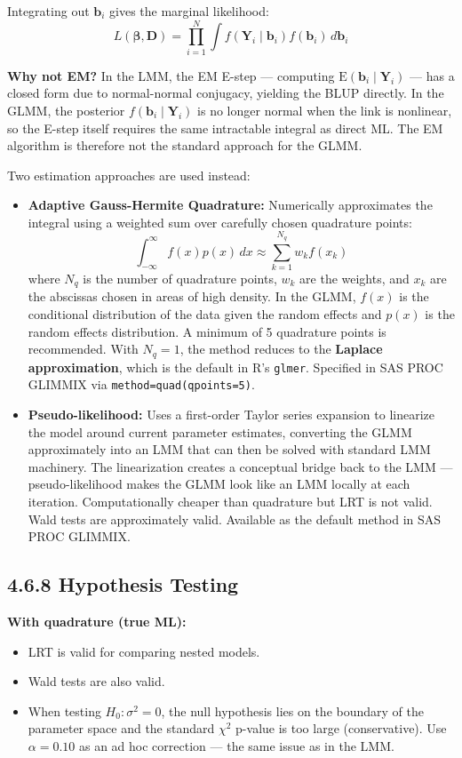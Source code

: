\documentclass[11pt]{article}
\newcommand{\bY}{\mathbf{Y}}
\newcommand{\bbeta}{\boldsymbol{\beta}}
\newcommand{\E}{\mathrm{E}}
\begin{document}
Integrating out $\mathbf{b}_i$ gives the marginal likelihood:
$$L(\bbeta, \mathbf{D}) = \prod_{i=1}^N \int f(\bY_i \mid \mathbf{b}_i) f(\mathbf{b}_i) \, d\mathbf{b}_i$$

\textbf{Why not EM?} In the LMM, the EM E-step --- computing $\E(\mathbf{b}_i \mid \bY_i)$ --- has a closed form due to normal-normal conjugacy, yielding the BLUP directly. In the GLMM, the posterior $f(\mathbf{b}_i \mid \bY_i)$ is no longer normal when the link is nonlinear, so the E-step itself requires the same intractable integral as direct ML. The EM algorithm is therefore not the standard approach for the GLMM.

Two estimation approaches are used instead:

\begin{itemize}[leftmargin=2em]
  \item \textbf{Adaptive Gauss-Hermite Quadrature:} Numerically approximates the integral using a weighted sum over carefully chosen quadrature points:
  $$\int_{-\infty}^{\infty} f(x)p(x)\,dx \approx \sum_{k=1}^{N_q} w_k f(x_k)$$
  where $N_q$ is the number of quadrature points, $w_k$ are the weights, and $x_k$ are the abscissas chosen in areas of high density. In the GLMM, $f(x)$ is the conditional distribution of the data given the random effects and $p(x)$ is the random effects distribution. A minimum of 5 quadrature points is recommended. With $N_q = 1$, the method reduces to the \textbf{Laplace approximation}, which is the default in R's \texttt{glmer}. Specified in SAS PROC GLIMMIX via \texttt{method=quad(qpoints=5)}.

  \item \textbf{Pseudo-likelihood:} Uses a first-order Taylor series expansion to linearize the model around current parameter estimates, converting the GLMM approximately into an LMM that can then be solved with standard LMM machinery. The linearization creates a conceptual bridge back to the LMM --- pseudo-likelihood makes the GLMM look like an LMM locally at each iteration. Computationally cheaper than quadrature but LRT is not valid. Wald tests are approximately valid. Available as the default method in SAS PROC GLIMMIX.
\end{itemize}

\subsection*{4.6.8 Hypothesis Testing}

\textbf{With quadrature (true ML):}
\begin{itemize}[leftmargin=2em]
  \item LRT is valid for comparing nested models.
  \item Wald tests are also valid.
  \item When testing $H_0: \sigma^2 = 0$, the null hypothesis lies on the boundary of the parameter space and the standard $\chi^2$ p-value is too large (conservative). Use $\alpha = 0.10$ as an ad hoc correction --- the same issue as in the LMM.
\end{itemize}
\end{document}
